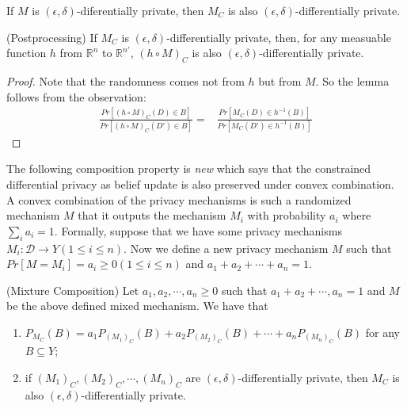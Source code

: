 \documentclass[11pt]{article}
\begin{document}
\begin{lemma}  \label{lem:privacy-preserving-imaging} If $M$  is $(\epsilon,\delta)$-diferentially private, then $M_C$ is also $(\epsilon,\delta)$-differentially private. 
\end{lemma}







\begin{lemma} (Postprocessing) \label{lem:postprocessing-imaging} If $M_C$ is $(\epsilon,\delta)$-differentially private, then, for any measuable  function $h$ from $\mathbb{R}^n$ to $\mathbb{R}^{n'}$, $(h\circ M)_C$ is also $(\epsilon,\delta)$-differentially private. 
\end{lemma}
\begin{proof} Note that the randomness comes not from $h$ but from $M$. So the lemma follows from the observation:
	\begin{align}
		\frac{Pr[(h\circ M)_C (D)\in B]}{Pr[(h\circ M)_C (D')\in B]} = & \frac{Pr[ M_C (D)\in h^{-1}(B)]}{Pr[ M_C (D')\in h^{-1}(B)]} \nonumber
	\end{align}
\end{proof}

The following composition property is \emph{new} which says that the constrained differential privacy as belief update is also preserved under convex combination.  A convex combination of the privacy mechanisms is such a randomized mechanism $M$ that it outputs the mechanism $M_i$ with probability $a_i$ where $\sum_i a_i =1$.  Formally, 
suppose that we have some privacy mechanisms $M_i: \mathcal{D}\rightarrow Y (1\leq i \leq n)$.   Now we define a new privacy mechanism $M$ such that $Pr[M = M_i]= a_i \geq 0 (1\leq i\leq n)$ and $a_1+a_2+ \cdots + a_n =1$. 

\begin{theorem} \label{thm:mixture} (Mixture Composition) Let $a_1, a_2, \cdots, a_n\geq 0$ such that $a_1 + a_2 +\cdots, a_n =1$ and $M$ be the above defined mixed mechanism.  We have that
\begin{enumerate}
	\item  $P_{M_C}(B) = a_1 P_{(M_1)_C} (B) + a_2 P_{(M_2)_C}(B) + \cdots + a_n P_{(M_n)_C}(B)$ for any $B\subseteq Y$;
	\item if $(M_1)_C, (M_2)_C, \cdots, (M_n)_C$ are $(\epsilon,\delta)$-differentially private, then $M_C$ is also $(\epsilon,\delta)$-differentially private. 
\end{enumerate}
\end{theorem}
\end{document}
